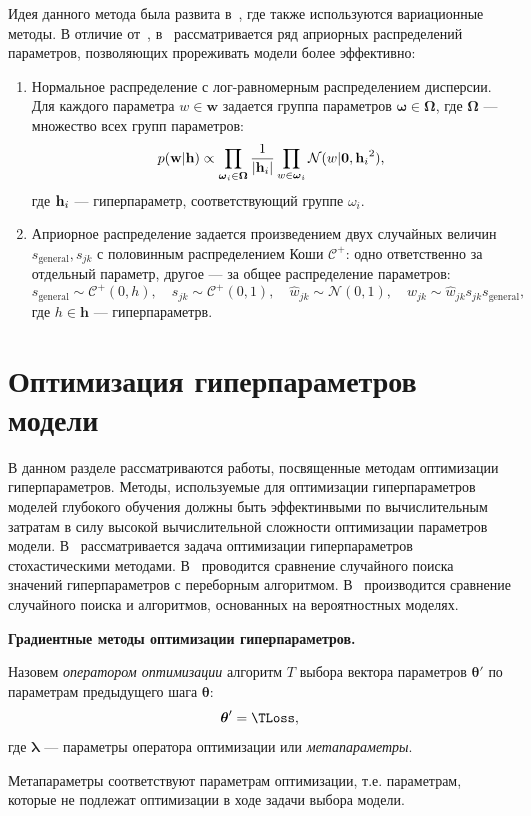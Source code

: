 Идея данного метода была развита в~\cite{bayes_compr}, где также используются вариационные методы.  В отличие от~\cite{nips}, в~\cite{bayes_compr} рассматривается ряд априорных распределений параметров, позволяющих прореживать модели более эффективно:
\begin{enumerate}
\item Нормальное распределение с лог-равномерным распределением дисперсии. Для каждого параметра $w \in \mathbf{w}$ задается группа параметров $\boldsymbol{\omega} \in \boldsymbol{\Omega}$, где $\boldsymbol{\Omega}$ --- множество всех групп параметров:
\[
    p(\mathbf{w}|\mathbf{h}) \propto \prod_{\boldsymbol{\omega}_i \in \boldsymbol{\Omega}} \frac{1}{|\mathbf{h}_i|}\prod_{w \in \boldsymbol{\omega}_i}\mathcal{N}(w|\mathbf{0}, {\mathbf{h}_i}^2),
\]
где $\mathbf{h}_i$ --- гиперпараметр, соответствующий группе $\omega_i$.
\item Априорное распределение задается произведением двух случайных величин ${s}_{\text{general}}, {s}_{jk}$ с половинным распределением Коши $\mathcal{C}^{+}$: одно ответственно за отдельный параметр, другое --- за общее распределение параметров:
\[
    {s}_{\text{general}} \sim \mathcal{C}^{+}(0, h), \quad  {s}_{jk} \sim \mathcal{C}^{+}(0,1), \quad \hat{w}_{jk} \sim \mathcal{N}(0,1), \quad w_{jk} \sim \hat{w}_{jk}s_{jk}  {s}_{\text{general}},
\]
где $h \in \mathbf{h}$ --- гиперпараметрв.

\end{enumerate}

\section{Оптимизация гиперпараметров модели}
В данном разделе рассматриваются работы, посвященные методам оптимизации гиперпараметров. Методы, используемые для оптимизации гиперпараметров моделей глубокого обучения должны быть эффектинвыми по вычислительным затратам в силу высокой вычислительной сложности оптимизации параметров модели. 
В~\cite{random1,random2} рассматривается задача оптимизации гиперпараметров стохастическими методами. В~\cite{random1} проводится сравнение случайного поиска значений гиперпараметров с переборным алгоритмом. В~\cite{random2} производится сравнение случайного поиска и алгоритмов, основанных на вероятностных моделях.

\textbf{Градиентные методы оптимизации гиперпараметров. } 
\begin{defin} Назовем \textit{оператором оптимизации} алгоритм $T$ выбора вектора параметров $\boldsymbol{\theta}'$  по параметрам предыдущего шага $\boldsymbol{\theta}$:
\begin{equation}
\label{eq:optim_operator}
	\teta' = \TLoss,
\end{equation}
где $\boldsymbol{\lambda}$ --- параметры оператора оптимизации или \textit{метапараметры}.
\end{defin}
Метапараметры соответствуют параметрам оптимизации, т.е. параметрам, которые не подлежат оптимизации в ходе задачи выбора модели. 

